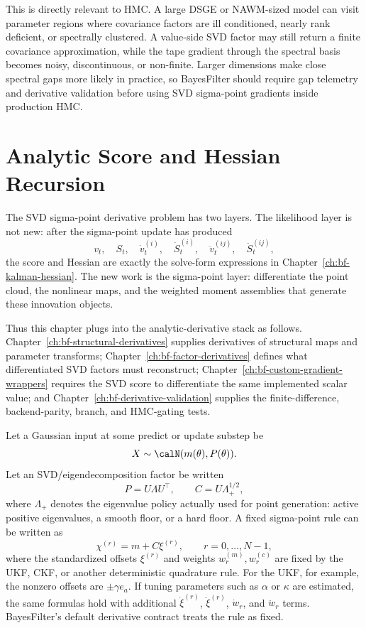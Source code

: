 This is directly relevant to HMC.  A large DSGE or NAWM-sized model can visit
parameter regions where covariance factors are ill conditioned, nearly rank
deficient, or spectrally clustered.  A value-side SVD factor may still return a
finite covariance approximation, while the tape gradient through the spectral
basis becomes noisy, discontinuous, or non-finite.  Larger dimensions make
close spectral gaps more likely in practice, so BayesFilter should require
gap telemetry and derivative validation before using SVD sigma-point gradients
inside production HMC.

\section{Analytic Score and Hessian Recursion}
\label{sec:bf-svd-sp-analytic-recursion}

The SVD sigma-point derivative problem has two layers.  The likelihood layer is
not new: after the sigma-point update has produced
\[
  v_t,\quad S_t,\quad
  \dot v_t^{(i)},\quad \dot S_t^{(i)},\quad
  \ddot v_t^{(ij)},\quad \ddot S_t^{(ij)},
\]
the score and Hessian are exactly the solve-form expressions in
Chapter~\ref{ch:bf-kalman-hessian}.  The new work is the sigma-point layer:
differentiate the point cloud, the nonlinear maps, and the weighted moment
assemblies that generate these innovation objects.

Thus this chapter plugs into the analytic-derivative stack as follows.
Chapter~\ref{ch:bf-structural-derivatives} supplies derivatives of structural
maps and parameter transforms; Chapter~\ref{ch:bf-factor-derivatives} defines
what differentiated SVD factors must reconstruct; Chapter~\ref{ch:bf-custom-gradient-wrappers}
requires the SVD score to differentiate the same implemented scalar value; and
Chapter~\ref{ch:bf-derivative-validation} supplies the finite-difference,
backend-parity, branch, and HMC-gating tests.

Let a Gaussian input at some predict or update substep be
\[
  X\sim\calN(m(\theta),P(\theta)).
\]
Let an SVD/eigendecomposition factor be written
\[
  P=U\Lambda U^\top,\qquad
  C=U\Lambda_+^{1/2},
\]
where $\Lambda_+$ denotes the eigenvalue policy actually used for point
generation: active positive eigenvalues, a smooth floor, or a hard floor.  A
fixed sigma-point rule can be written as
\begin{equation}
\label{eq:bf-svd-sp-cloud}
  \chi^{(r)} = m + C\xi^{(r)},\qquad r=0,\ldots,N-1,
\end{equation}
where the standardized offsets $\xi^{(r)}$ and weights
$w_r^{(m)},w_r^{(c)}$ are fixed by the UKF, CKF, or another deterministic
quadrature rule.  For the UKF, for example, the nonzero offsets are
$\pm\gamma e_a$.  If tuning parameters such as $\alpha$ or $\kappa$ are
estimated, the same formulas hold with additional $\dot\xi^{(r)}$,
$\ddot\xi^{(r)}$, $\dot w_r$, and $\ddot w_r$ terms.  BayesFilter's default
derivative contract treats the rule as fixed.

